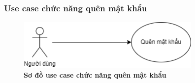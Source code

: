 \subsubsection{Use case chức năng quên mật khẩu}
  \begin{figure}[H]
    \centering
    \includegraphics[width=9cm,height=2.5cm]{Images/use_case/use_case_forgot_password.png}
    \caption[Sơ đồ use case chức năng quên mật khẩu]{\bfseries \fontsize{12pt}{0pt}
    \selectfont Sơ đồ use case chức năng quên mật khẩu}
    \label{use_case_forget_password} %
  \end{figure}

